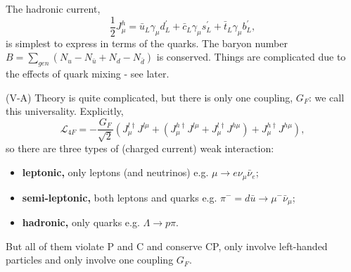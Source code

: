 \documentclass[a4paper,12pt]{article}
\begin{document}
The hadronic current,
\begin{equation}
\frac{1}{2}J_\mu^h = \bar{u}_L\gamma_\mu d_L^\prime + \bar{c}_L \gamma_\mu s_L^\prime + \bar{t}_L \gamma_\mu b_L^\prime,
\end{equation}
is simplest to express in terms of the quarks. The baryon number $B = \sum_{gen} (N_u -N_{\bar{u}} + N_d - N_{\bar{d}})$ is conserved. Things are complicated due to the effects of quark mixing - see later.

(V-A) Theory is quite complicated, but there is only one coupling, $G_F$: we call this universality. Explicitly,
\begin{equation}
\mathcal{L}_{4F} = -\frac{G_F}{\sqrt{2}} (J_\mu^{l \dagger} J^{l\mu} + (J_\mu^{h \dagger} J^{l\mu} + J_\mu^{l \dagger} J^{h\mu}) + J_\mu^{h \dagger} J^{h\mu} ),
\end{equation}
so there are three types of (charged current) weak interaction:
\begin{itemize}
    \item \textbf{leptonic,} only leptons (and neutrinos) e.g. $\mu \to e \nu_\mu \bar{\nu}_e$;
    \item \textbf{semi-leptonic,} both leptons and quarks e.g. $\pi^- = d\bar{u} \to \mu^- \bar{\nu}_\mu$;
    \item \textbf{hadronic,} only quarks e.g. $\Lambda \to p \pi$.
\end{itemize}
But all of them violate P and C and conserve CP, only involve left-handed particles and only involve one coupling $G_F$. 
\newline
\newline
\end{document}
